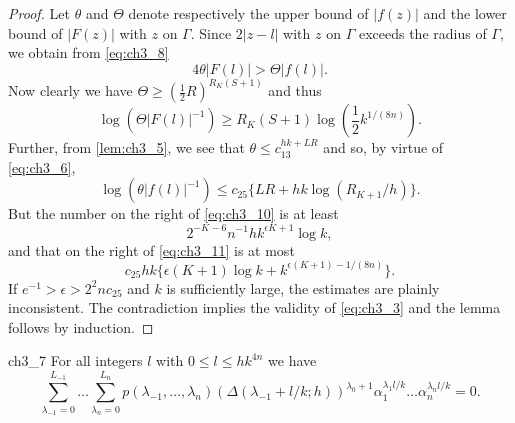 \begin{proof}
Let $\theta$ and $\Theta$ denote respectively the upper bound of $|f(z)|$ and the lower bound of $|F(z)|$ with $z$ on $\Gamma$. Since $2|z-l|$ with $z$ on $\Gamma$ exceeds the radius of $\Gamma$, we obtain from \eqref{eq:ch3_8}
\begin{equation} \label{eq:ch3_9}\tag{9}
4\theta |F(l)| > \Theta |f(l)|.
\end{equation}
Now clearly we have $\Theta \ge (\frac{1}{2}R)^{R_K(S+1)}$ and thus
\begin{equation} \label{eq:ch3_10}\tag{10}
\log \left(\Theta |F(l)|^{-1}\right) \ge R_K(S+1)\log \left(\frac{1}{2}k^{1/(8n)}\right).
\end{equation}
Further, from \autoref{lem:ch3_5}, we see that $\theta \le c_{13}^{hk+LR}$ and so, by virtue of \eqref{eq:ch3_6},
\begin{equation} \label{eq:ch3_11}\tag{11}
\log (\theta |f(l)|^{-1}) \le c_{25} \{ LR + hk \log (R_{K+1}/h) \}.
\end{equation}
But the number on the right of \eqref{eq:ch3_10} is at least
\[
2^{-K-6}n^{-1} h k^{\epsilon K+1} \log k,
\]
and that on the right of \eqref{eq:ch3_11} is at most
\[
c_{25} h k \{\epsilon(K+1)\log k + k^{\epsilon(K+1)-1/(8n)}\}.
\]
If $e^{-1} > \epsilon > 2^{2}n c_{25}$ and $k$ is sufficiently large, the estimates are plainly inconsistent. The contradiction implies the validity of \eqref{eq:ch3_3} and the lemma follows by induction.
\end{proof}

\begin{mylemma}{}{ch3_7}
For all integers $l$ with $0 \le l \le hk^{4n}$ we have
\begin{equation} \label{eq:ch3_12}\tag{12}
\sum_{\lambda_{-1}=0}^{L_{-1}} \dots \sum_{\lambda_n=0}^{L_n} p(\lambda_{-1}, \dots, \lambda_n) \left( \Delta(\lambda_{-1} + l/k; h) \right)^{\lambda_0+1} \alpha_1^{\lambda_1 l/k} \dots \alpha_n^{\lambda_n l/k} = 0.
\end{equation}
\end{mylemma}

